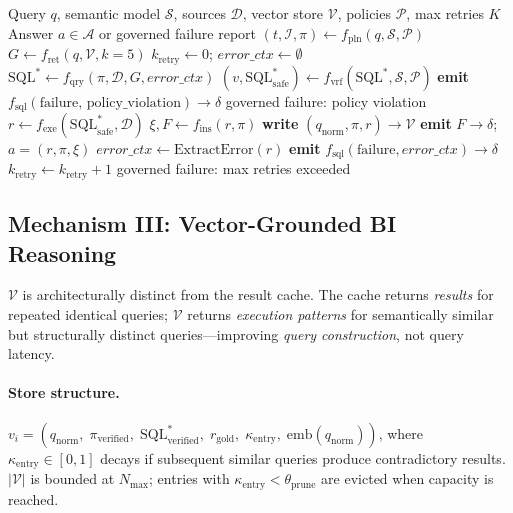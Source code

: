 \documentclass[11pt,a4paper]{article}
\begin{document}
\begin{algorithm}[htbp]
\caption{C2C Orchestration Pipeline}\label{alg:main}
\begin{algorithmic}[1]
\Require Query $q$, semantic model $\mathcal{S}$, sources $\mathcal{D}$,
         vector store $\mathcal{V}$, policies $\mathcal{P}$, max retries $K$
\Ensure  Answer $a \in \mathcal{A}$ or governed failure report
\State $(t, \mathcal{I}, \pi) \gets f_\mathrm{pln}(q, \mathcal{S}, \mathcal{P})$
\State $G \gets f_\mathrm{ret}(q, \mathcal{V}, k{=}5)$
\State $k_\mathrm{retry} \gets 0$; $\mathit{error\_ctx} \gets \emptyset$
  \State $\text{SQL}^* \gets f_\mathrm{qry}(\pi, \mathcal{D}, G, \mathit{error\_ctx})$
  \State $(v, \text{SQL}^*_\mathrm{safe}) \gets f_\mathrm{vrf}(\text{SQL}^*, \mathcal{S}, \mathcal{P})$
    \State \textbf{emit} $f_\mathrm{sql}(\text{failure, policy\_violation}) \to \delta$
    \State \Return governed failure: policy violation
  \EndIf
  \State $r \gets f_\mathrm{exe}(\text{SQL}^*_\mathrm{safe}, \mathcal{D})$
    \State $\xi, F \gets f_\mathrm{ins}(r, \pi)$
    \State \textbf{write} $(q_\mathrm{norm}, \pi, r) \to \mathcal{V}$
    \State \textbf{emit} $F \to \delta$; \Return $a = (r, \pi, \xi)$
  \Else
    \State $\mathit{error\_ctx} \gets \mathrm{ExtractError}(r)$
    \State \textbf{emit} $f_\mathrm{sql}(\text{failure}, \mathit{error\_ctx}) \to \delta$
    \State $k_\mathrm{retry} \gets k_\mathrm{retry} + 1$
  \EndIf
\EndWhile
\State \Return governed failure: max retries exceeded
\end{algorithmic}
\end{algorithm}

\subsection{Mechanism III: Vector-Grounded BI Reasoning}\label{sec:mechanism3}

$\mathcal{V}$ is architecturally distinct from the result cache.  The cache returns
\emph{results} for repeated identical queries; $\mathcal{V}$ returns \emph{execution
patterns} for semantically similar but structurally distinct queries---improving
\emph{query construction}, not query latency.

\paragraph{Store structure.}
$v_i = (q_\mathrm{norm},\; \pi_\mathrm{verified},\; \text{SQL}^*_\mathrm{verified},\;
r_\mathrm{gold},\; \kappa_\mathrm{entry},\; \mathrm{emb}(q_\mathrm{norm}))$,
where $\kappa_\mathrm{entry} \in [0,1]$ decays if subsequent similar queries produce
contradictory results.  $|\mathcal{V}|$ is bounded at $N_\mathrm{max}$; entries
with $\kappa_\mathrm{entry} < \theta_\mathrm{prune}$ are evicted when capacity is
reached.
\end{document}
